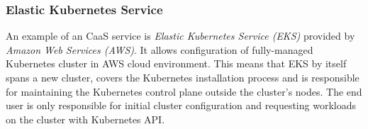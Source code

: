 \subsubsection{Elastic Kubernetes Service}
\label{s:ProblemDomain:EKS}

An example of an CaaS service is \emph{Elastic Kubernetes Service (EKS)} \cite{b:IBM-CaaS} provided by \emph{Amazon Web Services (AWS)}.
It allows configuration of fully-managed Kubernetes cluster \cite{b:AWS-EKS} in AWS cloud environment.
This means that EKS by itself spans a new cluster, covers the Kubernetes installation process and is responsible for maintaining the Kubernetes control plane outside the cluster's nodes.
The end user is only responsible for initial cluster configuration and requesting workloads on the cluster with Kubernetes API.